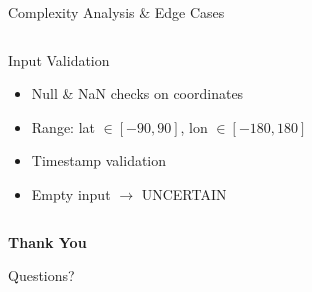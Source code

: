 \documentclass[aspectratio=169,xcolor=dvipsnames,9pt]{beamer}
\begin{document}
\begin{frame}{Complexity Analysis \& Edge Cases}
\begin{columns}[T]
        \vspace{0.3em}

        \begin{block}{Input Validation}
            \begin{itemize}
                \item Null \& NaN checks on coordinates
                \item Range: lat $\in [-90, 90]$, lon $\in [-180, 180]$
                \item Timestamp validation
                \item Empty input $\to$ UNCERTAIN
            \end{itemize}
        \end{block}
    \end{columns}
\end{frame}

\begin{frame}
    \Huge{\centerline{\textbf{Thank You}}}
    \vspace{1em}
    \normalsize{\centerline{Questions?}}
\end{frame}

\end{document}
